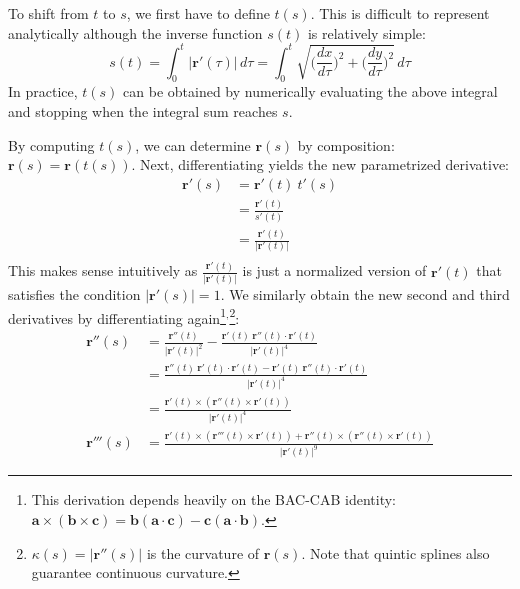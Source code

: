 \documentclass{article}
\newcommand{\norm}[1]{\lvert #1 \rvert}
\begin{document}
To shift from $t$ to $s$, we first have to define $t(s)$. This is difficult to represent analytically although the inverse function $s(t)$ is relatively simple:
$$
    s(t) = \int_0^t \! \norm{\mathbf{r}'(\tau)} \, d\tau = \int_0^t \! \sqrt{\bigg(\frac{dx}{d\tau}\bigg)^2 + \bigg(\frac{dy}{d\tau}\bigg)^2} \, d\tau
$$
In practice, $t(s)$ can be obtained by numerically evaluating the above integral and stopping when the integral sum reaches $s$.

By computing $t(s)$, we can determine $\mathbf{r}(s)$ by composition: $\mathbf{r}(s) = \mathbf{r}(t(s))$. Next, differentiating yields the new parametrized derivative:
\begin{equation*}
\begin{split}
    \mathbf{r}'(s) &= \mathbf{r}'(t)\ t'(s) \\
                   &= \frac{\mathbf{r}'(t)}{s'(t)} \\
                   &= \frac{\mathbf{r}'(t)}{\norm{\mathbf{r}'(t)}} \\
\end{split}
\end{equation*}
This makes sense intuitively as $\frac{\mathbf{r}'(t)}{\norm{\mathbf{r}'(t)}}$ is just a normalized version of $\mathbf{r}'(t)$ that satisfies the condition $\norm{\mathbf{r}'(s)} = 1$. We similarly obtain the new second and third derivatives by differentiating again\footnote{This derivation depends heavily on the BAC-CAB identity: $\mathbf{a} \times (\mathbf{b} \times \mathbf{c}) = \mathbf{b} (\mathbf{a} \cdot \mathbf{c}) - \mathbf{c} (\mathbf{a} \cdot \mathbf{b})$.}$^{,}$\footnote{$\kappa(s) = \norm{\mathbf{r}''(s)}$ is the curvature of $\mathbf{r}(s)$. Note that quintic splines also guarantee continuous curvature.}:
\begin{equation*}
\begin{split}
    \mathbf{r}''(s) &= \frac{\mathbf{r}''(t)}{\norm{\mathbf{r}'(t)}^2} - \frac{\mathbf{r}'(t)\ \mathbf{r}''(t) \cdot \mathbf{r}'(t)}{\norm{\mathbf{r}'(t)}^4} \\
                    &= \frac{\mathbf{r}''(t)\ \mathbf{r}'(t) \cdot \mathbf{r}'(t) - \mathbf{r}'(t)\ \mathbf{r}''(t) \cdot \mathbf{r}'(t)}{\norm{\mathbf{r}'(t)}^4} \\
                    &= \frac{\mathbf{r}'(t) \times (\mathbf{r}''(t) \times \mathbf{r}'(t))}{\norm{\mathbf{r}'(t)}^4} \\
    \mathbf{r}'''(s) &= \frac{\mathbf{r}'(t) \times (\mathbf{r}'''(t) \times \mathbf{r}'(t)) + \mathbf{r}''(t) \times (\mathbf{r}''(t) \times \mathbf{r}'(t))}{\norm{\mathbf{r}'(t)}^9}
\end{split}
\end{equation*}
\end{document}
